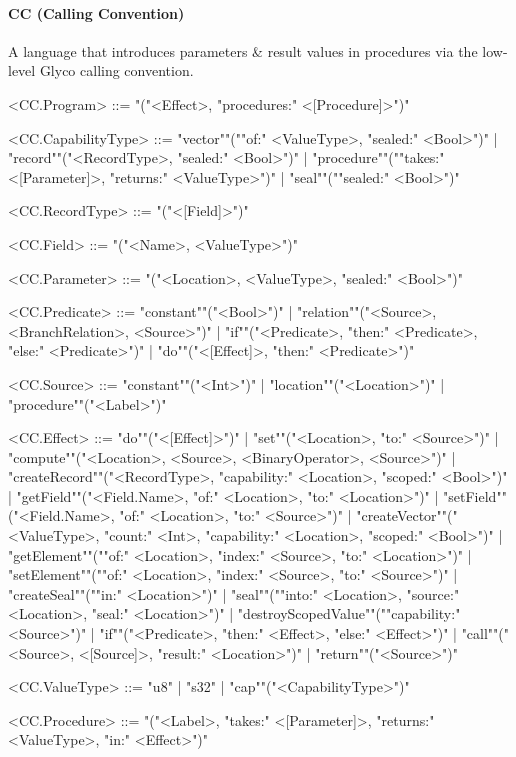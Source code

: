 \documentclass[main.tex]{subfiles}
\begin{document}
\paragraph{ CC (Calling Convention) } A language that introduces parameters \& result values in procedures via the low-level Glyco calling convention.
\begin{grammar}
	\footnotesize
				<CC.Program> ::=
							"("<Effect>, "procedures:" <[Procedure]>")"
				\par
				<CC.CapabilityType> ::=
						"vector""(""of:" <ValueType>, "sealed:" <Bool>")"
						| "record""("<RecordType>, "sealed:" <Bool>")"
						| "procedure""(""takes:" <[Parameter]>, "returns:" <ValueType>")"
						| "seal""(""sealed:" <Bool>")"
				\par
				<CC.RecordType> ::=
							"("<[Field]>")"
				\par
				<CC.Field> ::=
							"("<Name>, <ValueType>")"
				\par
				<CC.Parameter> ::=
							"("<Location>, <ValueType>, "sealed:" <Bool>")"
				\par
				<CC.Predicate> ::=
						"constant""("<Bool>")"
						| "relation""("<Source>, <BranchRelation>, <Source>")"
						| "if""("<Predicate>, "then:" <Predicate>, "else:" <Predicate>")"
						| "do""("<[Effect]>, "then:" <Predicate>")"
				\par
				<CC.Source> ::=
						"constant""("<Int>")"
						| "location""("<Location>")"
						| "procedure""("<Label>")"
				\par
				<CC.Effect> ::=
						"do""("<[Effect]>")"
						| "set""("<Location>, "to:" <Source>")"
						| "compute""("<Location>, <Source>, <BinaryOperator>, <Source>")"
						| "createRecord""("<RecordType>, "capability:" <Location>, "scoped:" <Bool>")"
						| "getField""("<Field.Name>, "of:" <Location>, "to:" <Location>")"
						| "setField""("<Field.Name>, "of:" <Location>, "to:" <Source>")"
						| "createVector""("<ValueType>, "count:" <Int>, "capability:" <Location>, "scoped:" <Bool>")"
						| "getElement""(""of:" <Location>, "index:" <Source>, "to:" <Location>")"
						| "setElement""(""of:" <Location>, "index:" <Source>, "to:" <Source>")"
						| "createSeal""(""in:" <Location>")"
						| "seal""(""into:" <Location>, "source:" <Location>, "seal:" <Location>")"
						| "destroyScopedValue""(""capability:" <Source>")"
						| "if""("<Predicate>, "then:" <Effect>, "else:" <Effect>")"
						| "call""("<Source>, <[Source]>, "result:" <Location>")"
						| "return""("<Source>")"
				\par
				<CC.ValueType> ::=
						"u8"
						| "s32"
						| "cap""("<CapabilityType>")"
				\par
				<CC.Procedure> ::=
							"("<Label>, "takes:" <[Parameter]>, "returns:" <ValueType>, "in:" <Effect>")"
				\par
\end{grammar}
\par
\end{document}
